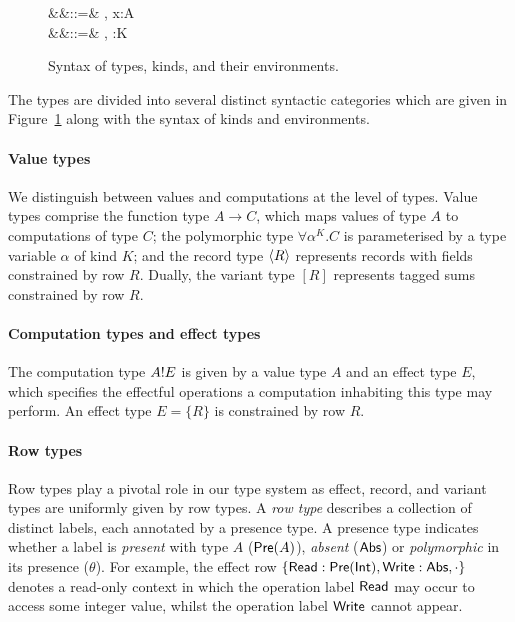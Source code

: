 \documentclass[12pt,phd,lfcs,twoside,openright,logo,leftchapter,normalheadings]{infthesis}
\theoremstyle{plain}
\theoremstyle{definition}
\begin{document}
\begin{figure}
\begin{syntax}
 &\Gamma \in \TyEnvCat   &::=& \cdot \mid \Gamma, x:A \\
 &\Delta \in \KindEnvCat &::=& \cdot \mid \Delta, \alpha:K \\
\end{syntax}
  \caption{Syntax of types, kinds, and their environments.}
  \label{fig:base-language-types}
\end{figure}
%
The types are divided into several distinct syntactic categories which
are given in Figure~\ref{fig:base-language-types} along with the
syntax of kinds and environments.
%
\paragraph{Value types}
We distinguish between values and computations at the level of
types. Value types comprise the function type $A \to C$, which maps
values of type $A$ to computations of type $C$; the polymorphic type
$\forall \alpha^K . C$ is parameterised by a type variable $\alpha$ of
kind $K$; and the record type $\langle R \rangle$ represents records with
fields constrained by row $R$. Dually, the variant type $[R]$
represents tagged sums constrained by row $R$.

\paragraph{Computation types and effect types}
The computation type $A ! E$ is given by a value type $A$ and an
effect type $E$, which specifies the effectful operations a
computation inhabiting this type may perform. An effect type
$E = \{R\}$ is constrained by row $R$.

\paragraph{Row types}
Row types play a pivotal role in our type system as effect, record,
and variant types are uniformly given by row types. A \emph{row type}
describes a collection of distinct labels, each annotated by a
presence type. A presence type indicates whether a label is
\emph{present} with type $A$ ($\mathsf{Pre}(A)$), \emph{absent} ($\mathsf{Abs}$) or
\emph{polymorphic} in its presence ($\theta$).
%
For example, the effect row $\{\mathsf{Read}:\mathsf{Pre}(\mathsf{Int}),\mathsf{Write}:\mathsf{Abs},\cdot\}$
denotes a read-only context in which the operation label $\mathsf{Read}$ may
occur to access some integer value, whilst the operation label
$\mathsf{Write}$ cannot appear.
%
\end{document}
